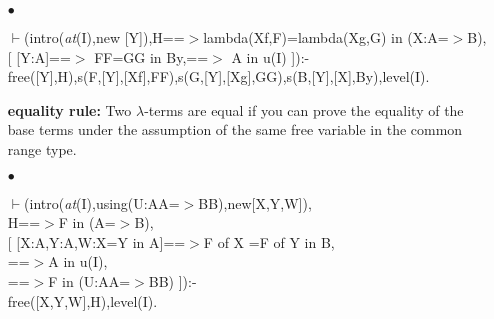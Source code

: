 \documentclass[11pt]{report}
\begin{document}
\begin{enumerate}
 {\bf membership rule:}
 A $\lambda$-term $lambda(X,F)$ is an element of the type 
 $Y$$:$$A$$\rightarrow$$B$ at any universe level 
 if $F_{[Z/X]}$ is a member of $B_{[Z/Y]}$ under the 
 assumption of $Z$ being an arbitrary element of $A$,
 and if the domain type $A$ is a member of that given 
 universe level.
 \item[$\bullet$]
\begin{sf}\begin{tabbing}
$\vdash$(intro(\mbox{\it at}(I),new [Y]),H==$>$lambda(Xf,F)=lambda(Xg,G) in (X:A=$>$B),\\[-0.15ex]
\hspace{2em}[ [Y:A]==$>$ FF=GG in By,==$>$ A in u(I) ]):-\\[-0.15ex]
\hspace{2em}free([Y],H),s(F,[Y],[Xf],FF),s(G,[Y],[Xg],GG),s(B,[Y],[X],By),level(I).
\end{tabbing}\end{sf}

 {\bf equality rule:}
 Two $\lambda$-terms are equal if you can prove the equality
 of the base terms under the assumption of the same free variable
 in the common range type.
 \item[$\bullet$]
\begin{sf}\begin{tabbing}
$\vdash$(intro(\mbox{\it at}(I),using(U:AA=$>$BB),new[X,Y,W]),\\[-0.15ex]
\hspace{2em}H==$>$F in (A=$>$B), \\[-0.15ex]
\hspace{2em}[ [X:A,Y:A,W:X=Y in A]==$>$F of X =F of Y in B,\\[-0.15ex]
\hspace{3em}==$>$A in u(I),\\[-0.15ex]
\hspace{3em}==$>$F in (U:AA=$>$BB) ]):-\\[-0.15ex]
\hspace{2em}free([X,Y,W],H),level(I).\\[-0.7ex]
\\[-0.7ex]

\end{tabbing}\end{sf}

 \end{enumerate}
  
\end{document}

